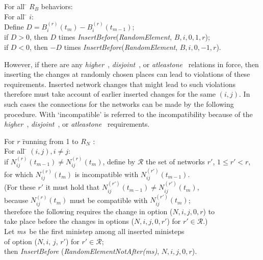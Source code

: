 \documentclass[a4paper,12pt,fleqn]{article}
\newcommand{\nnm}[1]{\textsf{\small\textit{#1}\ }}
\newcommand{\ms}{\textsl{\textsf{\small ms}}} %
\begin{document}
\begin{enumerate}
\begin{tabbing}
      For all \= $R_B$ behaviors: \\
         \> For all \= $i$:\\
          \> \> Define $D = B^{(r)}_{i}(t_{m}) - B^{(r)}_{i}(t_{m-1})$;\\
            \> \> if $D > 0$, then $D$ times
                \textit{InsertBefore}(\textit{RandomElement}, $B,i,0,1,r$);\\
            \> \> if $D < 0$, then $-D$ times
               \textit{InsertBefore}(\textit{RandomElement}, $B,i,0,-1,r$).
       \end{tabbing}
       However, if there are any \nnm{higher}, \nnm{disjoint}, or
       \nnm{atleastone} relations in force, then inserting the changes
       at randomly chosen places can lead to violations of these
       requirements. Inserted network changes that might lead to
       such violations therefore must take account of
       earlier inserted changes for the same $(i,j)$.
       In such cases the connections for the networks can be made
       by the following procedure.
       With `incompatible' is referred to the incompatibility
       because of the \nnm{higher}, \nnm{disjoint}, or \nnm{atleastone}
       requirements.
      \begin{tabbing}
      For $ r $ \= running from 1 to $R_N$ :\\
         \> For all \= $(i,j), i \neq j$:\\
          \> \> if $N^{(r)}_{ij}(t_{m-1}) \neq N^{(r)}_{ij}(t_m)$,
                define by $\mathcal R$ the set of networks $r'$,
                       $1 \leq r' < r$, \\
          \> \> for which $ N^{(r)}_{ij}(t_m)$ is incompatible
                with $ N^{(r')}_{ij}(t_{m-1})$.\\
          \> \> (For these $r'$ it must hold that
                 $N^{(r')}_{ij}(t_{m-1}) \neq N^{(r')}_{ij}(t_m)$, \\
          \> \> because $ N^{(r)}_{ij}(t_m)$ must be compatible
                with $ N^{(r')}_{ij}(t_{m})$;\\
          \> \> therefore the following requires the change in option ($N,i,j,0,r$) to \\
          \> \> take place   before the changes in options ($N,i,j,0,r'$) for $r' \in \mathcal R$.)\\
          \> \> Let \ms \ be the first ministep among all inserted ministeps \\
          \> \> of option ($N, i,\, j,\, r'$) for $r' \in \mathcal R$;\\
            \> \> then \textit{InsertBefore}
                          (\textit{RandomElementNotAfter(\ms)}, $N,i,j,0,r$).
      \end{tabbing}
\end{enumerate}
\end{document}
